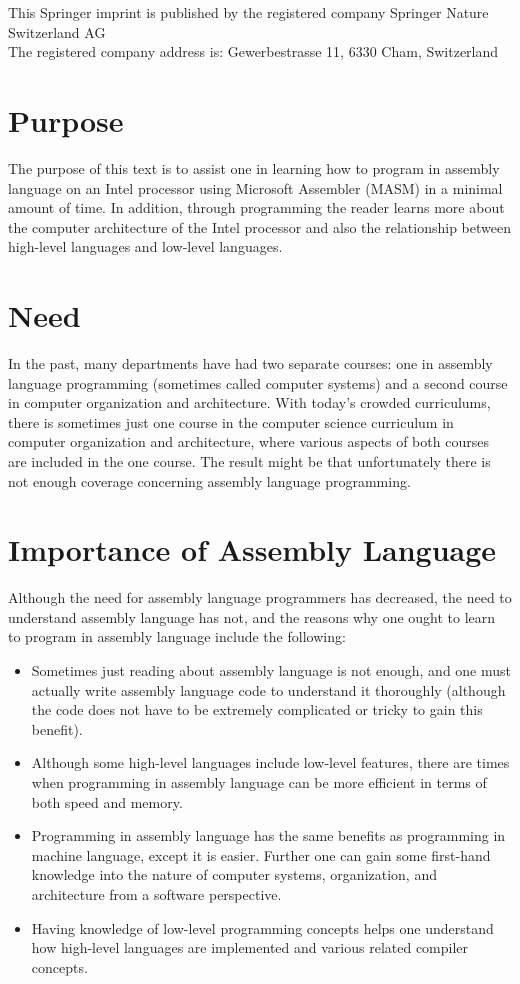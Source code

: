 \documentclass[10pt]{book}
\begin{document}
This Springer imprint is published by the registered company Springer Nature Switzerland AG\\
The registered company address is: Gewerbestrasse 11, 6330 Cham, Switzerland


\section{Purpose}
The purpose of this text is to assist one in learning how to program in assembly language on an Intel processor using Microsoft Assembler (MASM) in a minimal amount of time. In addition, through programming the reader learns more about the computer architecture of the Intel processor and also the relationship between high-level languages and low-level languages.

\section{Need}
In the past, many departments have had two separate courses: one in assembly language programming (sometimes called computer systems) and a second course in computer organization and architecture. With today's crowded curriculums, there is sometimes just one course in the computer science curriculum in computer organization and architecture, where various aspects of both courses are included in the one course. The result might be that unfortunately there is not enough coverage concerning assembly language programming.

\section{Importance of Assembly Language}
Although the need for assembly language programmers has decreased, the need to understand assembly language has not, and the reasons why one ought to learn to program in assembly language include the following:

\begin{itemize}
  \item Sometimes just reading about assembly language is not enough, and one must actually write assembly language code to understand it thoroughly (although the code does not have to be extremely complicated or tricky to gain this benefit).
  \item Although some high-level languages include low-level features, there are times when programming in assembly language can be more efficient in terms of both speed and memory.
  \item Programming in assembly language has the same benefits as programming in machine language, except it is easier. Further one can gain some first-hand\\

knowledge into the nature of computer systems, organization, and architecture from a software perspective.
  \item Having knowledge of low-level programming concepts helps one understand how high-level languages are implemented and various related compiler concepts.
\end{itemize}
\end{document}
